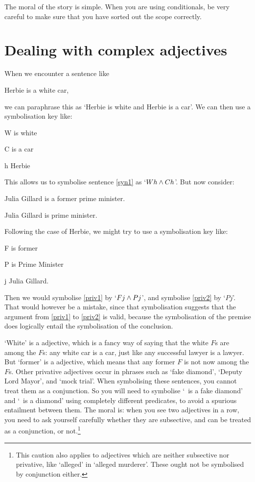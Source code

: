 The moral of the story is simple. When you are using conditionals, be very careful to make sure that you have sorted out the scope correctly. 

\section{Dealing with complex adjectives%
}
When we encounter a sentence like 
	\begin{earg}
		\item[\ex{syn1}] Herbie is a white car,
	\end{earg}
we can paraphrase this as `Herbie is white and Herbie is a car'. We can then use a symbolisation key like:
	\begin{ekey}
		\item[W\meta{x}]  is white
		\item[C\meta{x}]  is a car
		\item[h] Herbie
	\end{ekey}
This allows us to symbolise sentence \ref{syn1} as `$Wh \wedge Ch$'. But now consider:
\begin{earg}
	\item[\ex{priv1}] Julia Gillard is a former prime minister.
	\item[\ex{priv2}] Julia Gillard is prime minister.
\end{earg}
Following the case of Herbie, we might try to use a symbolisation key like:
	\begin{ekey}
		\item[F\meta{x}]  is former
		\item[P\meta{x}]  is Prime Minister
		\item[j] Julia Gillard.
	\end{ekey}
Then we would symbolise \ref{priv1} by `$Fj \wedge Pj$', and symbolise \ref{priv2} by `$Pj$'. That would however be a mistake, since that symbolisation suggests that the argument from \ref{priv1} to \ref{priv2} is valid, because the symbolisation of the premise does logically entail the symbolisation of the conclusion. 

`White' is a  adjective, which is a fancy way of saying that the white $F$s are among the $F$s: any white car is a car, just like any successful lawyer is a lawyer. But `former' is a  adjective, which means that any former $F$ is not now among the $F$s. Other privative adjectives occur in phrases such as `fake diamond', `Deputy Lord Mayor', and `mock trial'. When symbolising these sentences, you cannot treat them as a conjunction. So you will need to symbolise `\blank\ is a fake diamond' and `\blank\ is a diamond' using completely different predicates, to avoid a spurious entailment between them. The moral is: when you see two adjectives in a row, you need to ask yourself carefully whether they are subsective, and can be treated as a conjunction, or not.\footnote{This caution also applies to adjectives  which are neither subsective nor privative, like `alleged' in `alleged murderer'. These ought not be symbolised by conjunction either.}

